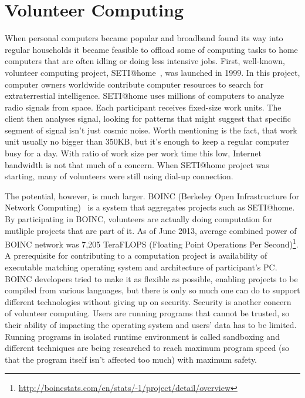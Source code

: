 \section{Volunteer Computing}

\begin{comment}

które seti@home cytować?

seti-experimentInComputing.pdf ?

\end{comment}

When personal computers became popular and broadband found its way into regular households it became feasible to offload some of computing tasks to home computers that are often idling or doing less intensive jobs. First, well-known, volunteer computing project, SETI@home~\cite{anderson2002seti}, was launched in 1999. In this project, computer owners worldwide contribute computer resources to search for extraterrestial intelligence. SETI@home uses millions of computers to analyze radio signals from space. Each participant receives fixed-size work units. The client then analyses signal, looking for patterns that might suggest that specific segment of signal isn't just cosmic noise. Worth mentioning is the fact, that work unit usually no bigger than 350KB, but it's enough to keep a regular computer busy for a day. With ratio of work size per work time this low, Internet bandwidth is not that much of a concern. When SETI@home project was starting, many of volunteers were still using dial-up connection.

\begin{comment}

BOINC
Average FLOPS 2013-06-19: 7,205,094.2 GigaFLOPS / 7,205.094 TeraFLOPS
http://boincstats.com/en/stats/-1/project/detail/overview

\end{comment}

The potential, however, is much larger. BOINC (Berkeley Open Infrastructure for Network Computing)~\cite{anderson2004boinc} is a system that aggregates projects such as SETI@home. By participating in BOINC, volunteers are actually doing computation for mutliple projects that are part of it. As of June 2013, average combined power of BOINC network was 7,205 TeraFLOPS (Floating Point Operations Per Second)\footnote{\url{http://boincstats.com/en/stats/-1/project/detail/overview}}. A prerequisite for contributing to a computation project is availability of executable matching operating system and architecture of participant's PC. BOINC developers tried to make it as flexible as possible, enabling projects to be compiled from various languages, but there is only so much one can do to support different technologies without giving up on security. Security is another concern of volunteer computing. Users are running programs that cannot be trusted, so their ability of impacting the operating system and users' data has to be limited. Running programs in isolated runtime environment is called sandboxing and different techniques are being researched to reach maximum program speed (so that the program itself isn't affected too much) with maximum safety.

